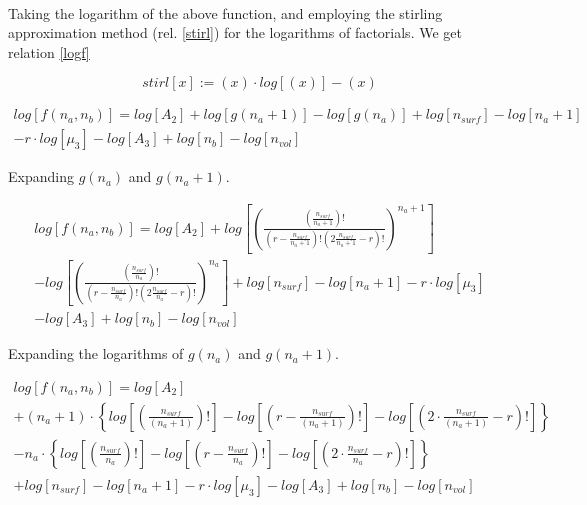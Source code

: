 \documentclass[10pt,letterpaper]{article}
\newcommand{\nads}[1]{
    \ensuremath{
        \frac{
            n_{surf}
        }{
            #1
        }
    }
}
\newcommand{\nlp}[1]{
    \ensuremath{
        r
        -
        \nads{#1}
    }
}
\newcommand{\stirl}[1]{
    \ensuremath{
        \left(
            #1
        \right)
        \cdotp 
        log
        \left[
            \left(
            #1
            \right)
        \right]
        -
        \left(
            #1
        \right)
    }
}
\newcommand{\logOFgOFm}[1]{
	\ensuremath{
	#1
	\cdot
	\left\{
    	log
    	\left[
    	    \left(
    	        \nads{#1}
    	    \right)!
    	\right]
    	-
    	log
    	\left[
        	\left(
        	    \nlp{#1}
        	\right)!
    	\right]
    	-
    	log
    	\left[
    	    \left(
        	    2
        	    \cdot
        	    \nads{#1}
        	    -
        	    r
            \right)!
    	\right]
	\right\}
	}
}
\newcommand{\gOFm}[2]{
\left( \frac{
\left(\frac{#2}{#1}\right)!}{ 
\left(r-\frac{#2}{#1}\right)! 
\left(2\frac{#2}{#1}-r\right)!}
\right)^{#1}  
}
\begin{document}
\text{}\\
\noindent Taking the logarithm of the above function, and employing the stirling approximation method (rel. \ref{stirl}) for the logarithms of factorials. We get relation \ref{logf}

\begin{equation}
	\boxed{stirl[x]:=\stirl{x}}
	\label{stirl}
\end{equation}


\begin{multline}
	log
	\left[
	f(n_a,n_b)
	\right]
	=
	log
		\left[
		A_2
		\right]
		+
		log\left[
            g(n_a+1)
        \right]
        -
        log\left[
            g(n_a)
        \right]
		+
		log
		\left[
		n_{surf}
		\right]
		-
		log
		\left[
		n_a+1
		\right]\\
		-
		r
		\cdot
		log
		\left[
		\mu_{3}
		\right]
		-
		log
		\left[
		A_3
		\right]
		+
		log
		\left[
		n_{b}
		\right]
		-
		log
		\left[
		n_{vol}	
	\right]
		\label{logf}
\end{multline}

\noindent Expanding $g(n_a)$ and $g(n_a +1)$.

\begin{multline}
	log
	\left[
	f(n_a,n_b)
	\right]
	=
	log
		\left[
		A_2
		\right]
		+
		log\left[
            \gOFm{n_a+1}{n_{surf}}
        \right]\\
        -
        log\left[
            \gOFm{n_a}{n_{surf}}
        \right]
		+
		log
		\left[
		n_{surf}
		\right]
		-
		log
		\left[
		n_a+1
		\right]
		-
		r
		\cdot
		log
		\left[
		\mu_{3}
		\right]\\
		-
		log
		\left[
		A_3
		\right]
		+
		log
		\left[
		n_{b}
		\right]
		-
		log
		\left[
		n_{vol}	
	\right]
		\label{logfexpnd1}
\end{multline}

\noindent Expanding the logarithms of $g(n_a)$ and $g(n_a +1)$.

\begin{multline}
	log
	\left[
	    f(n_a,n_b)
	\right]
	=
	log
	\left[
		A_2
	\right]\\
	+
	\logOFgOFm{(n_a+1)}\\
    -
    \logOFgOFm{n_a}\\
	+
	log
	\left[
		n_{surf}
	\right]
		-
		log
		\left[
		n_a+1
		\right]
		-
		r
		\cdot
		log
		\left[
		\mu_{3}
		\right]
		-
		log
		\left[
		A_3
		\right]
		+
		log
		\left[
		n_{b}
		\right]
		-
		log
		\left[
		n_{vol}	
	\right]
		\label{logfexpnd1}
\end{multline}
\end{document}
